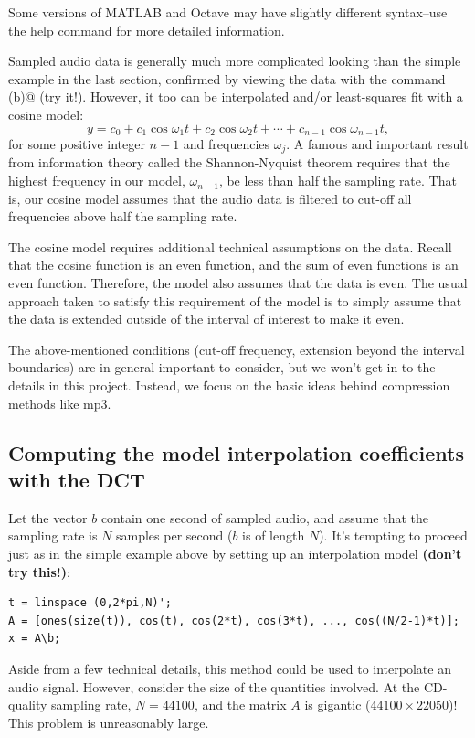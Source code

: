 \documentclass[10pt]{article}
\begin{document}
Some versions of MATLAB and Octave may have slightly different syntax--use the
help command for more detailed information. 
 
Sampled audio data is generally much more complicated looking than the simple
example in the last section, confirmed by viewing the data with the command
\verb@plot(b)@ (try it!). However, it too can be interpolated and/or
least-squares fit with a cosine model:
\[
y = c_0 + c_1\cos\omega_1t + c_2\cos\omega_2t + \cdots + c_{n-1}\cos\omega_{n-1}t,
\]
for some positive integer $n-1$ and frequencies ${\omega_j}$.  A famous and
important result from information theory called the Shannon-Nyquist theorem
requires that the highest frequency in our model, $\omega_{n - 1}$,  be less
than half the sampling rate. That is, our cosine model assumes that the audio
data is filtered to cut-off all frequencies above half the sampling rate. 

The cosine model requires additional technical assumptions on the data.  Recall
that the cosine function is an even function, and the sum of even functions is
an even function. Therefore, the model also assumes that the data is even. The
usual approach taken to satisfy this requirement of the model is to simply
assume that the data is extended outside of the interval of interest to make it
even.

The above-mentioned conditions (cut-off frequency, extension beyond the
interval boundaries) are in general important to consider, but we won't get in
to the details in this project.  Instead, we focus on the basic ideas behind
compression methods like mp3. 

\subsection*{Computing the model interpolation coefficients with the DCT}

Let the vector $b$ contain one second of sampled audio, and assume that the
sampling rate is $N$ samples per second ($b$ is of length $N$).  It's tempting
to proceed just as in the simple example above by setting up an interpolation
model  {\bf (don't try this!)}:
\begin{verbatim}
t = linspace (0,2*pi,N)';
A = [ones(size(t)), cos(t), cos(2*t), cos(3*t), ..., cos((N/2-1)*t)];
x = A\b;
\end{verbatim}
Aside from a few technical details, this method could be used to interpolate
an audio signal. However, consider the size of the quantities involved.
At the CD-quality sampling rate, $N=44100$, and the matrix $A$ is
gigantic ($44100\times 22050$)!  This problem is unreasonably large.
\end{document}
